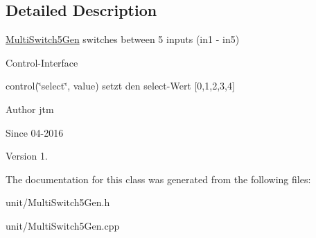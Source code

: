 \subsection{Detailed Description}
\hyperlink{classunit_1_1MultiSwitch5Gen}{Multi\+Switch5\+Gen} switches between 5 inputs (in1 -\/ in5)

Control-\/\+Interface


\begin{DoxyItemize}
\item control(\char`\"{}select\char`\"{}, value) setzt den select-\/\+Wert \mbox{[}0,1,2,3,4\mbox{]}
\end{DoxyItemize}

\begin{DoxyAuthor}{Author}
jtm 
\end{DoxyAuthor}
\begin{DoxySince}{Since}
04-\/2016 
\end{DoxySince}
\begin{DoxyVersion}{Version}
1. 
\end{DoxyVersion}


The documentation for this class was generated from the following files\+:\begin{DoxyCompactItemize}
\item 
unit/Multi\+Switch5\+Gen.\+h\item 
unit/Multi\+Switch5\+Gen.\+cpp\end{DoxyCompactItemize}
